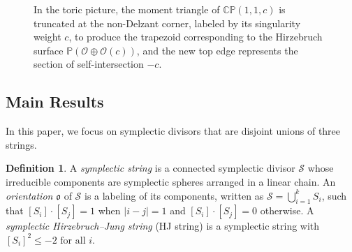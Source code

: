 \documentclass[11pt]{article}
\theoremstyle{definition}
\newtheorem{definition}[theorem]{Definition}
\theoremstyle{remark}
\newcommand{\CP}{\mathbb{CP}}
\newcommand{\st}{\mathcal{S}}
\begin{document}
\begin{figure}[htbp]
  \centering
  \caption{In the toric picture, the moment triangle of $\CP(1,1,c)$ is truncated at the non-Delzant corner, labeled by its  singularity weight $c$, to produce the trapezoid corresponding to the Hirzebruch surface $\mathbb{P}(\mathcal{O}\oplus\mathcal{O}(c))$, and the new top edge represents the section of self-intersection $-c$.}
  \label{fig:cp11c-truncation}
\end{figure}


\subsection{Main Results}

In this paper, we focus on symplectic divisors that are disjoint unions of three strings.

\begin{definition}
  A \emph{symplectic string} is a connected symplectic divisor
  \(
    \mathcal{S}
  \)
  whose irreducible components are symplectic spheres arranged in a linear chain. An \emph{orientation} $\mathfrak{o}$ of $\st$ is a labeling of its components, written as $\st=\bigcup_{i=1}^{k} S_i$, such that $[S_i]\cdot[S_j]=1$ when $|i-j|=1$ and $[S_i]\cdot[S_j]=0$ otherwise. A \emph{symplectic Hirzebruch--Jung string} (HJ string) is a symplectic string with
  \(
    [S_i]^2\le -2 \text{ for all } i.
  \) 
\end{definition}
\end{document}
